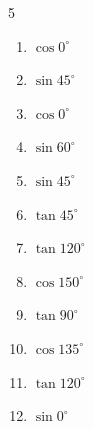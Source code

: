 \begin{multicols}{5}
\begin{enumerate}
        \phantom{$\displaystyle =0$}

  \item $\displaystyle \cos{0^\circ}$

        \phantom{$\displaystyle =1$}

  \item $\displaystyle \sin{45^\circ}$


\columnbreak %

  \item $\displaystyle \cos{0^\circ}$

        \phantom{$\displaystyle =1$}

  \item $\displaystyle \sin{60^\circ}$


  \item $\displaystyle \sin{45^\circ}$


  \item $\displaystyle \tan{45^\circ}$

        \phantom{$\displaystyle =1$}

  \item $\displaystyle \tan{120^\circ}$


  \item $\displaystyle \cos{150^\circ}$


  \item $\displaystyle \tan{90^\circ}$

        \phantom{$\displaystyle なし$}

  \item $\displaystyle \cos{135^\circ}$


  \item $\displaystyle \tan{120^\circ}$


  \item $\displaystyle \sin{0^\circ}$

        \phantom{$\displaystyle =0$}


\end{enumerate}
\end{multicols}

